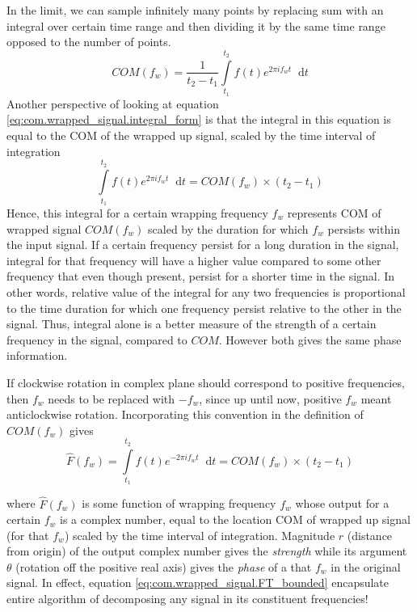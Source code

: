 \documentclass[11pt, a4paper]{article}
\newcommand{\diff}{\mathop{}\!\mathrm{d}}
\newcommand{\dt}{\diff t}
\newcommand{\dint}[2]{\int \limits_{#1}^{#2}}  %
\begin{document}
	In the limit, we can sample infinitely many points by replacing sum with an integral over certain time range and then dividing it by the same time range opposed to the number of points.
	\begin{equation}\label{eq:com.wrapped_signal.integral_form}
		COM(f_{w}) = \frac{1}{t_{2} - t_{1}} \dint{t_{1}}{t_{2}} f(t)e^{2\pi if_{w}t} \dt
	\end{equation}
	Another perspective of looking at equation \eqref{eq:com.wrapped_signal.integral_form} is that the integral in this equation is equal to the COM of the wrapped up signal, scaled by the time interval of integration
	\begin{equation}\label{eq:com.wrapped_signal.integral_only}
		\dint{t_{1}}{t_{2}} f(t)e^{2\pi if_{w}t} \dt = COM(f_{w}) \times (t_{2} - t_{1})
	\end{equation}
	Hence, this integral for a certain wrapping frequency $f_{w}$ represents COM of wrapped signal $COM(f_{w})$ scaled by the duration for which $f_{w}$ persists within the input signal. If a certain frequency persist for a long duration in the signal, integral for that frequency will have a higher value compared to some other frequency that even though present, persist for a shorter time in the signal. In other words, relative value of the integral for any two frequencies is proportional to the time duration for which one frequency persist relative to the other in the signal. Thus, integral alone is a better measure of the strength of a certain frequency in the signal, compared to $COM$. However both gives the same phase information. 
	
	If clockwise rotation in complex plane should correspond to positive frequencies, then $f_{w}$ needs to be replaced with $-f_{w}$, since up until now, positive $f_{w}$ meant anticlockwise rotation. Incorporating this convention in the definition of $COM(f_{w})$ gives
	\begin{equation}\label{eq:com.wrapped_signal.FT_bounded}
		\hat{F}(f_{w}) = \dint{t_{1}}{t_{2}} f(t)e^{-2\pi if_{w}t} \dt = COM(f_{w}) \times (t_{2} - t_{1})
	\end{equation}

	where $\hat{F}(f_{w})$ is some function of wrapping frequency $f_{w}$ whose output for a certain $f_{w}$ is a complex number, equal to the location COM of wrapped up signal (for that $f_{w}$) scaled by the time interval of integration. Magnitude $r$ (distance from origin) of the output complex number gives the \textit{strength} while its argument $\theta$ (rotation off the positive real axis) gives the \textit{phase} of a that $f_{w}$ in the original signal. In effect, equation \eqref{eq:com.wrapped_signal.FT_bounded} encapsulate entire algorithm of decomposing any signal in its constituent frequencies! 
	
\end{document}
